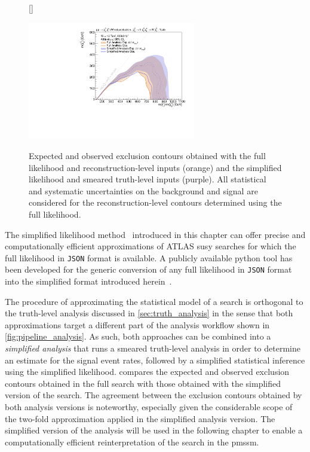 \begin{figure}
[\FBwidth]
{\caption{Expected and observed exclusion contours obtained with the full likelihood and reconstruction-level inputs (orange) and the simplified likelihood and smeared truth-level inputs (purple). All statistical and systematic uncertainties on the background and signal are considered for the reconstruction-level contours determined using the full likelihood.}\label{fig:exclusion_1Lbb_truthInput_BkgSignal_700_200_noLabel}}
{\includegraphics[width=0.65\textwidth]{exclusion_1Lbb_truthInput_BkgSignal_700_200_noLabel}}
\end{figure}

The simplified likelihood method~\cite{Schanet:2758958} introduced in this chapter can offer precise and computationally efficient approximations of ATLAS \gls{susy} searches for which the full likelihood in \texttt{JSON} format is available. A publicly available python tool has been developed for the generic conversion of any full likelihood in \texttt{JSON} format into the simplified format introduced herein~\cite{simplify}.

The procedure of approximating the statistical model of a search is orthogonal to the truth-level analysis discussed in \cref{sec:truth_analysis} in the sense that both approximations target a different part of the analysis workflow shown in \cref{fig:pipeline_analysis}.
As such, both approaches can be combined into a \textit{simplified analysis} that runs a smeared truth-level analysis in order to determine an estimate for the signal event rates, followed by a simplified statistical inference using the simplified likelihood.
 compares the expected and observed exclusion contours obtained in the full \onelepton search with those obtained with the simplified version of the search.
The agreement between the exclusion contours obtained by both analysis versions is noteworthy, especially given the considerable scope of the two-fold approximation applied in the simplified analysis version.
The simplified version of the \onelepton analysis will be used in the following chapter to enable a computationally efficient reinterpretation of the \onelepton search in the \gls{pmssm}.



